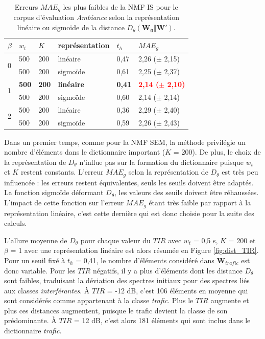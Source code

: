 \begin{table}[h]
\centering
\caption{Erreurs $MAE_g$ les plus faibles de la NMF IS pour le corpus d'évaluation \textit{Ambiance} selon la représentation linéaire ou sigmoïde de la distance $D_{\theta}(\mathbf{W_0}\Vert \mathbf{W'})$.}
\label{tab:erreur_ambiance_IS}
\begin{tabular}{C{1.2cm}C{1.2cm}C{1.2cm}C{2.5cm}C{1.2cm}C{2.5cm}}
\toprule
$\beta$ & $w_t$ & $K$ & \textbf{représentation} & $t_h$ & $MAE_g$ \\ \toprule
{} & 500 & 200 & linéaire & 0,47 & 2,26 ($\pm$ 2,15) \\
 & 500 & 200 & sigmoïde & 0,61 & 2,25 ($\pm$ 2,37) \\ \midrule
{} & \textbf{500} & \textbf{200} & \textbf{linéaire} & \textbf{0,41} & \textbf{\textcolor{red}{2,14 ($\pm$ 2,10)}} \\
 & 500 & 200 & sigmoïde & 0,60 & 2,14 ($\pm$ 2,14) \\ \midrule
{} & 500 & 200 & linéaire & 0,36 & 2,29 ($\pm$ 2,40)\\
 & 500 & 200 & sigmoïde &  0,59 & 2,26 ($\pm$ 2,43)  \\
\bottomrule
\end{tabular}
\end{table}

Dans un premier temps, comme pour la NMF SEM, la méthode privilégie un nombre d'éléments dans le dictionnaire important ($K$ = 200). De plus, le choix de la représentation de $D_{\theta}$ n'influe pas sur la formation du dictionnaire puisque $w_t$ et $K$ restent constants.
L'erreur $MAE_g$ selon la représentation de $D_{\theta}$ est très peu influencée : les erreurs restent équivalentes, seuls les seuils doivent être adaptés. La fonction sigmoïde déformant $D_{\theta}$, les valeurs des seuils doivent être réhaussées. L'impact de cette fonction sur l'erreur $MAE_g$ étant très faible par rapport à la représentation linéaire, c'est cette dernière qui est donc choisie pour la suite des calculs.

L'allure moyenne de $D_{\theta}$ pour chaque valeur du $TIR$ avec $w_t$ = 0,5 s, $K$ = 200 et $\beta$ = 1 avec une représentation linéaire est alors résumée en Figure \ref{fig:dist_TIR}. Pour un seuil fixé à $t_h$ = 0,41, le nombre d'éléments considéré dans $\mathbf{W}_{trafic}$ est donc variable. Pour les $TIR$ négatifs, il y a plus d'éléments dont les distance $D_{\theta}$ sont faibles, traduisant la déviation des spectres initiaux pour des spectres liés aux classes \textit{interférantes}. À $TIR$ = -12 dB, c'est 106 éléments en moyenne qui sont considérés comme appartenant à la classe \textit{trafic}. Plus le $TIR$ augmente et plus ces distances augmentent, puisque le trafic devient la classe de son prédominante. À $TIR$ = 12 dB, c'est alors 181 éléments qui sont inclus dans le dictionnaire \textit{trafic}.

